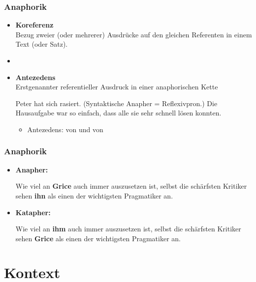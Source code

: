 
\begin{frame}
\frametitle{Anaphorik}

\begin{itemize}
	\item \textbf{Koreferenz}\\
Bezug zweier (oder mehrerer) Ausdrücke auf den gleichen Referenten in einem Text (oder Satz).
	\item[]
	\item \textbf{Antezedens} \\
Erstgenannter referentieller Ausdruck in einer anaphorischen Kette
		
		\eal 
		\ex Peter hat sich rasiert. (Syntaktische Anapher = Reflexivpron.)
		\ex Die Hausaufgabe war so einfach, dass alle sie sehr schnell lösen konnten.
		\zl
		
		\begin{itemize}
			\item Antezedens:  von  und  von 
		\end{itemize}
	
\end{itemize}

\end{frame}



\begin{frame}
\frametitle{Anaphorik}

\begin{itemize}
	\item \textbf{Anapher:}
	
	\ea Wie viel an \textbf{Grice} auch immer auszusetzen ist, selbst die schärfsten Kritiker sehen \textbf{ihn} als einen der wichtigsten Pragmatiker an.
	\z
	
	\item \textbf{Katapher:}
	
	\ea Wie viel an \textbf{ihm} auch immer auszusetzen ist, selbst die schärfsten Kritiker sehen \textbf{Grice} als einen der wichtigsten Pragmatiker an.
	\z
	
\end{itemize}

\end{frame}


%
\section{Kontext}
%

